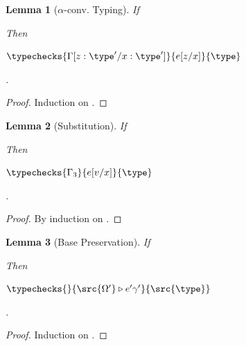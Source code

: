 \documentclass[a4paper,names,dvipsnames]{article}
\newtheorem{lemma}{Lemma}
\begin{document}
\begin{lemma}[$\alpha$-conv. Typing]\label{lem:alpha-conv-typing}
  If
  Then
  \begin{goals}
    \item $\typechecks{\Gamma[z:\type'/x:\type']}{e[z/x]}{\type}$
  \end{goals}.
\end{lemma}
\begin{proof}
  Induction on .
\end{proof}

\begin{lemma}[Substitution]\label{lem:substitution}
  If
  Then
  \begin{goals}
    \item $\typechecks{\Gamma_3}{e[v/x]}{\type}$
  \end{goals}.
\end{lemma}
\begin{proof}
  By induction on .
\end{proof}

\begin{lemma}[Base Preservation]\label{lem:base-preservation}
  If
  Then
  \begin{goals}
    \item $\typechecks{}{\src{\Omega'}\triangleright e'\gamma'}{\src{\type}}$
  \end{goals}.
\end{lemma}
\begin{proof}
  Induction on .
\end{proof}
\end{document}
